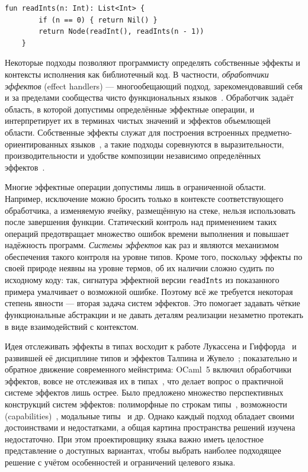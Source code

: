 \documentclass{ProcISPRAS}
\begin{document}
\noindent\begin{minipage}{\linewidth}
\begin{lstlisting}[language=colang]
    fun readInts(n: Int): List<Int> {
        if (n == 0) { return Nil() }
        return Node(readInt(), readInts(n - 1))
    }
\end{lstlisting}
\end{minipage}

Некоторые подходы позволяют программисту определять собственные эффекты и контексты
исполнения как библиотечный код. В частности, \emph{обработчики эффектов} (effect
handlers) --- многообещающий подход, зарекомендовавший себя и за пределами
сообщества чисто функциональных языков~\cite{plotkin2013handling,
chandrasekaran2018algebraic, phipps2023continuing}. Обработчик задаёт область, в которой допустимы
определённые эффектные операции, и интерпретирует их в терминах чистых значений и эффектов
объемлющей области. Собственные эффекты служат для построения встроенных
предметно-ориентированных языков~\cite{leijen2017structured}, а такие подходы
соревнуются в выразительности, производительности и удобстве композиции
независимо определённых эффектов~\cite{liang1995monad, kiselyov2013extensible,
schrijvers2019monad, van2024framework}.

Многие эффектные операции допустимы лишь в ограниченной области. Например,
исключение можно бросить только в контексте соответствующего обработчика, а
изменяемую ячейку, размещённую на стеке, нельзя использовать после завершения
функции. Статический контроль над применением таких операций предотвращает множество
ошибок времени выполнения и повышает надёжность программ. \emph{Системы эффектов} как раз
и являются механизмом обеспечения такого контроля на уровне типов. Кроме того, поскольку
эффекты по своей природе неявны на уровне термов, об их наличии сложно судить по исходному коду:
так, сигнатура эффектной версии \lstinline|readInts| из показанного примера умалчивает о возможной ошибке.
Поэтому всё же требуется некоторая степень явности --- вторая задача систем эффектов. Это помогает задавать чёткие функциональные абстракции и не давать деталям
реализации незаметно протекать в виде взаимодействий с контекстом.

Идея отслеживать эффекты в типах восходит к работе Лукассена и
Гиффорда~\cite{lucassen1988polymorphic} и развившей её дисциплине типов и
эффектов Талпина и Жувело~\cite{talpin1994type}; показательно и обратное движение
современного мейнстрима: OCaml~5 включил обработчики эффектов, вовсе не отслеживая их
в типах~\cite{sivaramakrishnan2021retrofitting}, что делает вопрос о практичной
системе эффектов лишь острее. Было предложено множество перспективных конструкций
систем эффектов:
полиморфные по строкам типы~\cite{leijen2014koka}, возможности (capabilities)~\cite{
brachthauser2022effects, boruch2023capturing}, модальные типы~\cite{tang2025modal}
и др. Однако каждый подход обладает своими достоинствами и недостатками, а общая
картина пространства решений изучена недостаточно. При этом проектировщику
языка важно иметь целостное представление о доступных вариантах, чтобы выбрать
наиболее подходящее решение с учётом особенностей и ограничений целевого языка.
\end{document}

